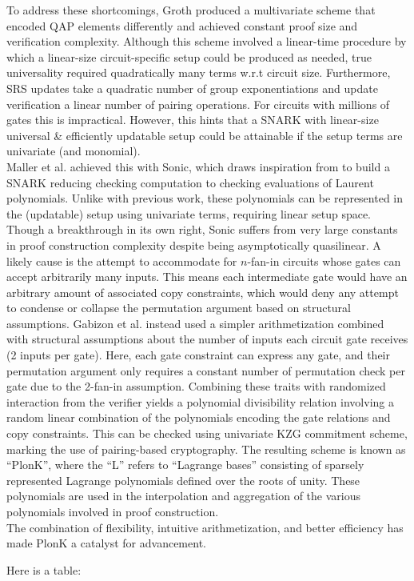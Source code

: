 \noindent To address these shortcomings, Groth \cite{grothupdatable} produced a multivariate scheme that encoded QAP elements differently and achieved constant proof size and verification complexity. Although this scheme involved a linear-time procedure by which a linear-size circuit-specific setup could be produced as needed, true universality required quadratically many terms w.r.t circuit size. Furthermore, SRS updates take a quadratic number of group exponentiations and update verification a linear number of pairing operations. For circuits with millions of gates this is impractical. However, this hints that a SNARK with linear-size universal \& efficiently updatable setup could be attainable if the setup terms are univariate (and monomial).\\

\noindent Maller et al. achieved this with Sonic, which draws inspiration from to build a SNARK reducing checking computation to checking evaluations of Laurent polynomials. Unlike with previous work, these polynomials can be represented in the (updatable) setup using univariate terms, requiring linear setup space. Though a breakthrough in its own right, Sonic suffers from very large constants in proof construction complexity despite being asymptotically quasilinear. A likely cause is the attempt to accommodate for $n$-fan-in circuits whose gates can accept arbitrarily many inputs. This means each intermediate gate would have an arbitrary amount of associated copy constraints, which would deny any attempt to condense or collapse the permutation argument based on structural assumptions. Gabizon et al. instead used a simpler arithmetization combined with structural assumptions about the number of inputs each circuit gate receives (2 inputs per gate). Here, each gate constraint can express any gate, and their permutation argument only requires a constant number of permutation check per gate due to the 2-fan-in assumption. Combining these traits with randomized interaction from the verifier yields a polynomial divisibility relation involving a random linear combination of the polynomials encoding the gate relations and copy constraints. This can be checked using univariate KZG commitment scheme, marking the use of pairing-based cryptography. The resulting scheme is known as ``PlonK'', where the ``L'' refers to ``Lagrange bases'' consisting of sparsely represented Lagrange polynomials defined over the roots of unity. These polynomials are used in the interpolation and aggregation of the various polynomials involved in proof construction.\\

\noindent The combination of flexibility, intuitive arithmetization, and better efficiency has made PlonK a catalyst for advancement.

\noindent Here is a table:

